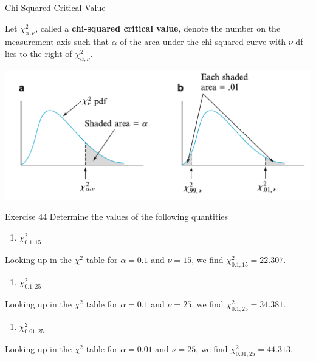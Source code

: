 \documentclass[
  ignorenonframetext,
]{beamer}
\providecommand{\tightlist}{%
  \setlength{\itemsep}{0pt}\setlength{\parskip}{0pt}}\usepackage{longtable,booktabs,array}
\begin{document}
\begin{frame}{Chi-Squared Critical Value}
\protect\hypertarget{chi-squared-critical-value}{}
\begin{tcolorbox}[enhanced jigsaw, titlerule=0mm, colbacktitle=quarto-callout-important-color!10!white, opacityback=0, bottomrule=.15mm, colback=white, colframe=quarto-callout-important-color-frame, arc=.35mm, title=\textcolor{quarto-callout-important-color}{\faExclamation}\hspace{0.5em}{Notation}, toprule=.15mm, breakable, coltitle=black, leftrule=.75mm, bottomtitle=1mm, left=2mm, rightrule=.15mm, toptitle=1mm, opacitybacktitle=0.6]

Let \(\chi^{2}_{\alpha,\nu}\), called a \textbf{chi-squared critical
value}, denote the number on the measurement axis such that \(\alpha\)
of the area under the chi-squared curve with \(\nu\) df lies to the
right of \(\chi^{2}_{\alpha,\nu}\).

\end{tcolorbox}

\includegraphics{images/notation.png}
\end{frame}

\begin{frame}{Exercise 44}
\protect\hypertarget{exercise-44}{}
Determine the values of the following quantities

\begin{enumerate}[<+->]
[a.]
\tightlist
\item
  \(\chi^{2}_{0.1,15}\)
\end{enumerate}

Looking up in the \(\chi^{2}\) table for \(\alpha = 0.1\) and
\(\nu = 15\), we find \(\chi^{2}_{0.1,15} = 22.307\).

\begin{enumerate}[<+->]
[a.]
\setcounter{enumi}{1}
\tightlist
\item
  \(\chi^{2}_{0.1, 25}\)
\end{enumerate}

Looking up in the \(\chi^{2}\) table for \(\alpha = 0.1\) and
\(\nu = 25\), we find \(\chi^{2}_{0.1,25} = 34.381\).

\begin{enumerate}[<+->]
[a.]
\setcounter{enumi}{2}
\tightlist
\item
  \(\chi^{2}_{0.01,25}\)
\end{enumerate}

Looking up in the \(\chi^{2}\) table for \(\alpha = 0.01\) and
\(\nu = 25\), we find \(\chi^{2}_{0.01,25} = 44.313\).
\end{frame}
\end{document}

